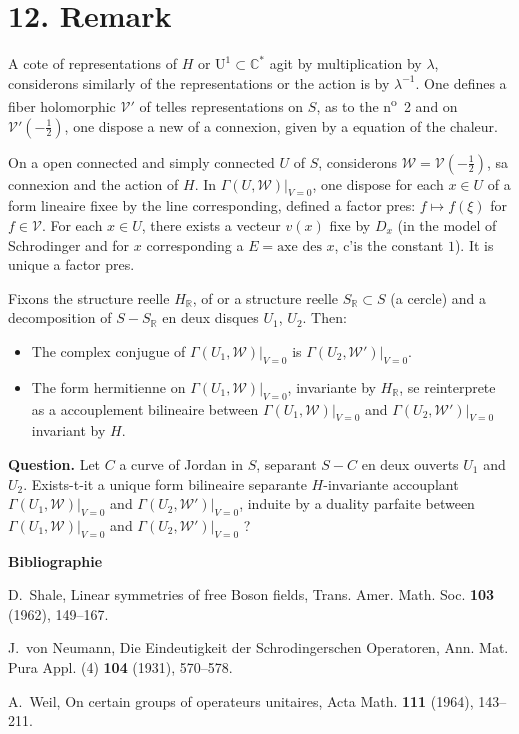 \documentclass[12pt,a4paper]{article}
\theoremstyle{plain}
\theoremstyle{definition}
\theoremstyle{remark}
\begin{document}
\section*{12. Remark}

A cote of representations of $H$ or $\mathrm{U}^1 \subset \mathbb{C}^*$ agit by multiplication by $\lambda$, considerons similarly of the representations or the action is by $\lambda^{-1}$. One defines a fiber holomorphic $\mathscr{V}'$ of telles representations on $S$, as to the n\textsuperscript{o}~2 and on $\mathscr{V}'(-\frac{1}{2})$, one dispose a new of a connexion, given by a equation of the chaleur.

On a open connected and simply connected $U$ of $S$, considerons $\mathscr{W} = \mathscr{V}(-\frac{1}{2})$, sa connexion and the action of $H$. In $\Gamma(U, \mathscr{W})|_{V=0}$, one dispose for each $x \in U$ of a form lineaire fixee by the line corresponding, defined a factor pres: $f \mapsto f(\xi)$ for $f \in \mathscr{V}$. For each $x \in U$, there exists a vecteur $v(x)$ fixe by $D_x$ (in the model of Schrodinger and for $x$ corresponding a $E = \text{axe des } x$, c'is the constant $1$). It is unique a factor pres.

Fixons the structure reelle $H_\mathbb{R}$, of or a structure reelle $S_\mathbb{R} \subset S$ (a cercle) and a decomposition of $S - S_\mathbb{R}$ en deux disques $U_1$, $U_2$. Then:
\begin{itemize}
\item[(a)] The complex conjugue of $\Gamma(U_1, \mathscr{W})|_{V=0}$ is $\Gamma(U_2, \mathscr{W}')|_{V=0}$.
\item[(b)] The form hermitienne on $\Gamma(U_1, \mathscr{W})|_{V=0}$, invariante by $H_\mathbb{R}$, se reinterprete as a accouplement bilineaire between $\Gamma(U_1, \mathscr{W})|_{V=0}$ and $\Gamma(U_2, \mathscr{W}')|_{V=0}$ invariant by $H$.
\end{itemize}

\medskip
\noindent\textbf{Question.} Let $C$ a curve of Jordan in $S$, separant $S - C$ en deux ouverts $U_1$ and $U_2$. Exists-t-it a unique form bilineaire separante $H$-invariante accouplant $\Gamma(U_1, \mathscr{W})|_{V=0}$ and $\Gamma(U_2, \mathscr{W}')|_{V=0}$, induite by a duality parfaite between $\Gamma(U_1, \mathscr{W})|_{V=0}$ and $\Gamma(U_2, \mathscr{W}')|_{V=0}$ ?

\vspace{2em}

\noindent\textbf{Bibliographie}

\begin{enumerate}[label={[\arabic*]}]
\item D.~Shale, Linear symmetries of free Boson fields, Trans. Amer. Math. Soc. \textbf{103} (1962), 149--167.
\item J.~von Neumann, Die Eindeutigkeit der Schrodingerschen Operatoren, Ann. Mat. Pura Appl. (4) \textbf{104} (1931), 570--578.
\item A.~Weil, On certain groups of operateurs unitaires, Acta Math. \textbf{111} (1964), 143--211.
\end{enumerate}
\end{document}
